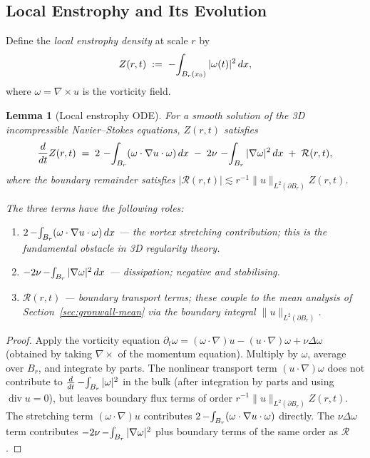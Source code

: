 \documentclass[11pt]{article}
\newtheorem{lemma}[theorem]{Lemma}
\theoremstyle{definition}
\theoremstyle{remark}
\newcommand{\grad}{\nabla}
\newcommand{\divg}{\operatorname{div}}
\newcommand{\dx}{\,dx}
\newcommand{\Xint}{\mathop{\mathchoice{\vcenter{\hbox{$\displaystyle-$}}}%
  {\vcenter{\hbox{$\textstyle-$}}}%
  {\vcenter{\hbox{$\scriptstyle-$}}}%
  {\vcenter{\hbox{$\scriptscriptstyle-$}}}}\!\int}
\begin{document}
\subsection{Local Enstrophy and Its Evolution}
\label{subsec:local-enstrophy}

Define the \emph{local enstrophy density} at scale $r$ by
\[
  Z(r,t) \;:=\; \Xint_{B_r(x_0)} |\omega(t)|^2 \dx,
\]
where $\omega = \grad \times u$ is the vorticity field.

\begin{lemma}[Local enstrophy ODE]\label{lem:local-enstrophy-ode}
For a smooth solution of the 3D incompressible Navier--Stokes equations,
$Z(r,t)$ satisfies
\begin{equation}\label{eq:enstrophy-ode}
  \frac{d}{dt} Z(r,t)
  \;=\;
  2\,\Xint_{B_r} (\omega \cdot \grad u \cdot \omega)\dx
  \;-\; 2\nu\,\Xint_{B_r} |\grad\omega|^2 \dx
  \;+\; \mathcal{R}(r,t),
\end{equation}
where the boundary remainder satisfies
$|\mathcal{R}(r,t)| \lesssim r^{-1}\|u\|_{L^2(\partial B_r)} Z(r,t)$.

The three terms have the following roles:
\begin{enumerate}[label=(\roman*)]
  \item $2\Xint_{B_r}(\omega\cdot\grad u\cdot\omega)\dx$ --- the
    \emph{vortex stretching} contribution; this is the fundamental obstacle
    in 3D regularity theory.
  \item $-2\nu\Xint_{B_r}|\grad\omega|^2\dx$ --- dissipation; negative
    and stabilising.
  \item $\mathcal{R}(r,t)$ --- boundary transport terms; these couple to the
    mean analysis of Section~\ref{sec:gronwall-mean} via the boundary integral
    $\|u\|_{L^2(\partial B_r)}$.
\end{enumerate}
\end{lemma}

\begin{proof}
Apply the vorticity equation
$\partial_t \omega = (\omega\cdot\grad)u - (u\cdot\grad)\omega + \nu\Delta\omega$
(obtained by taking $\grad\times$ of the momentum equation).
Multiply by $\omega$, average over $B_r$, and integrate by parts.
The nonlinear transport term $(u\cdot\grad)\omega$ does not contribute
to $\frac{d}{dt}\Xint_{B_r}|\omega|^2$ in the bulk (after integration by
parts and using $\divg u = 0$), but leaves boundary flux terms of
order $r^{-1}\|u\|_{L^2(\partial B_r)} Z(r,t)$.
The stretching term $(\omega\cdot\grad)u$ contributes
$2\Xint_{B_r}(\omega\cdot\grad u\cdot\omega)$ directly.
The $\nu\Delta\omega$ term contributes $-2\nu\Xint_{B_r}|\grad\omega|^2$
plus boundary terms of the same order as $\mathcal{R}$.
\end{proof}
\end{document}
